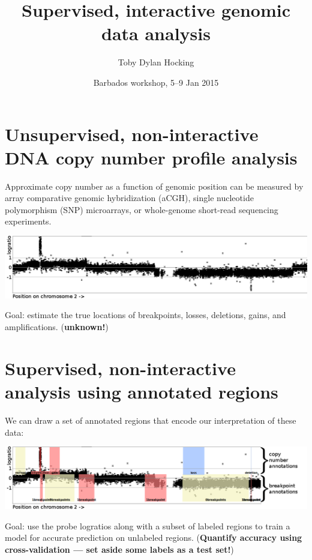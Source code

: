 \documentclass[a4paper,10pt]{article}
\begin{document}
\title{Supervised, interactive genomic data analysis
}
\author{
  Toby Dylan Hocking
}

\date{Barbados workshop, 5--9 Jan 2015}

\maketitle

\thispagestyle{empty}%
\pagestyle{empty}

\section*{Unsupervised, non-interactive
  DNA copy number profile analysis}

Approximate copy number as a function of genomic position can be
measured by array comparative genomic hybridization (aCGH), single
nucleotide polymorphism (SNP) microarrays, or whole-genome short-read
sequencing experiments.

\includegraphics[width=\textwidth]{unlabeled-axes}

Goal: estimate the true locations of breakpoints, losses,
deletions, gains, and amplifications. (\textbf{unknown!})

\section*{Supervised, non-interactive
 analysis using annotated regions}

We can draw a set of annotated regions that encode our interpretation
of these data:

\includegraphics[width=\textwidth]{regions-axes-full}

Goal: use the probe logratios along with a subset of labeled regions
to train a model for accurate prediction on unlabeled
regions. (\textbf{Quantify accuracy using cross-validation --- set
  aside some labels as a test set!})
\end{document}
